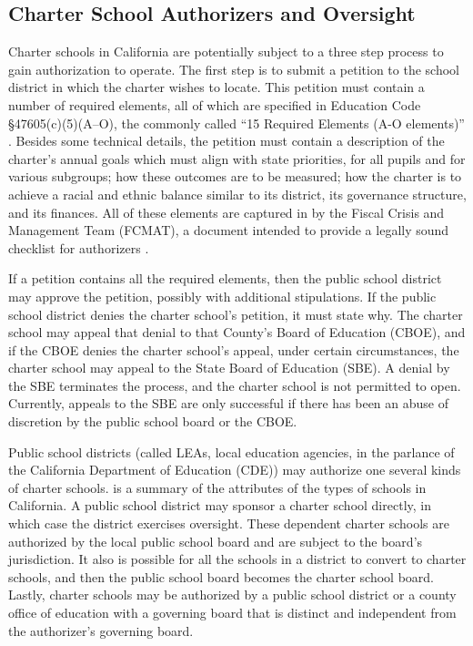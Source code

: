 \subsection{Charter School Authorizers and Oversight}\indent

Charter schools in California are potentially subject to a three step process to gain authorization to operate. The first step is to submit a petition to the school district in which the charter wishes to locate. This petition must contain a number of required elements, all of which are specified in Education Code §47605(c)(5)(A–O), the commonly called ``15 Required Elements (A-O elements)'' \parencite[89]{Aguinaldo.etal2021}. Besides some technical details, the petition must contain a description of the charter's annual goals which must align with state priorities, for all pupils and for various subgroups; how these outcomes are to be measured; how the charter is to achieve a racial and ethnic balance similar to its district, its governance structure, and its finances. All of these elements are captured in \textit{} by the Fiscal Crisis and Management Team (FCMAT), a document intended to provide a legally sound checklist for authorizers \parencite{FCMAT2022}.  %

If a petition contains all the required elements, then the public school district may approve the petition, possibly with additional stipulations. If the public school district denies the charter school's petition, it must state why. The charter school may appeal that denial to that County's Board of Education (CBOE), and if the CBOE denies the charter school's appeal, under certain circumstances, the charter school may appeal to the State Board of Education (SBE). A denial by the SBE terminates the process, and the charter school is not permitted to open. Currently, appeals to the SBE are only successful if there has been an abuse of discretion by the public school board or the CBOE.

Public school districts (called LEAs, local education agencies, in the parlance of the California Department of Education (CDE)) may authorize one several kinds of charter schools.  is a summary of the attributes of the types of schools in California. A public school district may sponsor a charter school directly, in which case the district exercises oversight. These dependent charter schools are authorized by the local public school board and are subject to the board's jurisdiction. It also is possible for all the schools in a district to convert to charter schools, and then the public school board becomes the charter school board. Lastly, charter schools may be authorized by a public school district or a county office of education with a governing board that is distinct and independent from the authorizer's governing board.

